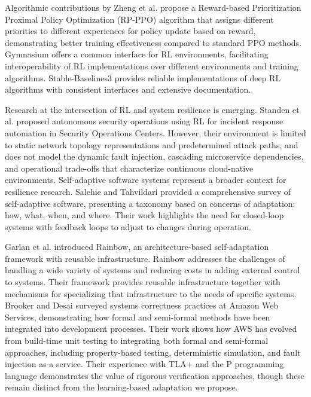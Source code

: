 \documentclass[conference,10pt]{IEEEtran}
\begin{document}
Algorithmic contributions by Zheng et al. \cite{zheng2025proximal} propose a Reward-based Prioritization Proximal Policy Optimization (RP-PPO) algorithm that assigns different priorities to different experiences for policy update based on reward, demonstrating better training effectiveness compared to standard PPO methods. Gymnasium \cite{towers2026gymnasium} offers a common interface for RL environments, facilitating interoperability of RL implementations over different environments and training algorithms. Stable-Baselines3 \cite{raffin2021stable} provides reliable implementations of deep RL algorithms with consistent interfaces and extensive documentation.

Research at the intersection of RL and system resilience is emerging. Standen et al. \cite{standen2021cyborg} proposed autonomous security operations using RL for incident response automation in Security Operations Centers. However, their environment is limited to static network topology representations and predetermined attack paths, and does not model the dynamic fault injection, cascading microservice dependencies, and operational trade-offs that characterize continuous cloud-native environments. Self-adaptive software systems represent a broader context for resilience research. Salehie and Tahvildari \cite{salehie2009self} provided a comprehensive survey of self-adaptive software, presenting a taxonomy based on concerns of adaptation: how, what, when, and where. Their work highlights the need for closed-loop systems with feedback loops to adjust to changes during operation.

Garlan et al. \cite{garlan2004rainbow} introduced Rainbow, an architecture-based self-adaptation framework with reusable infrastructure. Rainbow addresses the challenges of handling a wide variety of systems and reducing costs in adding external control to systems. Their framework provides reusable infrastructure together with mechanisms for specializing that infrastructure to the needs of specific systems. Brooker and Desai \cite{brooker2025systems} surveyed systems correctness practices at Amazon Web Services, demonstrating how formal and semi-formal methods have been integrated into development processes. Their work shows how AWS has evolved from build-time unit testing to integrating both formal and semi-formal approaches, including property-based testing, deterministic simulation, and fault injection as a service. Their experience with TLA+ and the P programming language demonstrates the value of rigorous verification approaches, though these remain distinct from the learning-based adaptation we propose.
\end{document}
